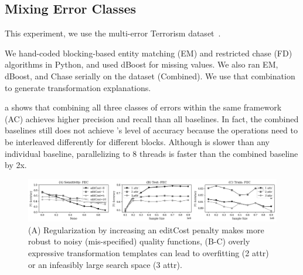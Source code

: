 \subsection{Mixing Error Classes}\label{s:expterror}
This experiment, we use the multi-error Terrorism dataset~\cite{data-terrorism}. 

 We hand-coded blocking-based entity matching (EM)  and restricted chase (FD) algorithms in Python, and used dBoost for missing values.  We also ran EM, dBoost, and Chase serially on the dataset (Combined). We use that combination to generate transformation explanations.



 a shows that combining  all three classes of errors within the same \sys framework (AC) achieves higher precision and recall than all baselines.  In fact, the combined baselines still does not achieve \sys's level of accuracy because the  operations need to be interleaved differently for different blocks.   Although \sys is slower than any individual baseline, parallelizing \sys to 8 threads is faster than the combined baseline by 2x. 



 \begin{figure}[t]
\centering
 \includegraphics[width=\textwidth]{exp/exp5.png}
 \caption{\small (A) Regularization by increasing an editCost penalty makes \sys more robust to noisy (mis-specified) quality functions, (B-C) overly expressive transformation templates can lead to overfitting (2 attr) or an infeasibly large search space (3 attr).  
 \label{fig:sensitivity}}
\end{figure}

